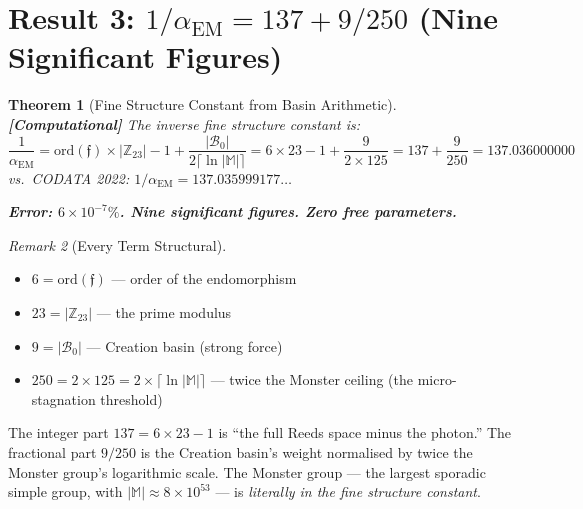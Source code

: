\documentclass[12pt,a4paper]{article}
\newcommand{\computational}[1]{\textcolor{computational}{\textbf{[Computational]}} #1}
\newtheorem{theorem}{Theorem}[section]
\theoremstyle{definition}\newtheorem{definition}[theorem]{Definition}
\theoremstyle{remark}\newtheorem{remark}[theorem]{Remark}
\newcommand{\Reeds}{\mathfrak{f}}
\newcommand{\Zp}{\mathbb{Z}_{23}}
\newcommand{\Basin}{\mathcal{B}}
\begin{document}
\section{Result 3: $1/\alpha_{\mathrm{EM}} = 137 + 9/250$ (Nine Significant Figures)}
\label{sec:alpha}

\begin{theorem}[Fine Structure Constant from Basin Arithmetic]
\label{thm:alpha}
\computational{The inverse fine structure constant is:}
\begin{equation}
  \boxed{\frac{1}{\alpha_{\mathrm{EM}}} = \mathrm{ord}(\Reeds) \times |\Zp| - 1
  + \frac{|\Basin_0|}{2 \lceil \ln|\mathbb{M}| \rceil}
  = 6 \times 23 - 1 + \frac{9}{2 \times 125}
  = 137 + \frac{9}{250}
  = 137.036000000}
\end{equation}
vs.\ CODATA 2022: $1/\alpha_{\mathrm{EM}} = 137.035999177\ldots$

\textbf{Error: $6 \times 10^{-7}\%$. Nine significant figures. Zero free parameters.}
\end{theorem}

\begin{remark}[Every Term Structural]
\begin{itemize}
  \item $6 = \mathrm{ord}(\Reeds)$ --- order of the endomorphism
  \item $23 = |\Zp|$ --- the prime modulus
  \item $9 = |\Basin_0|$ --- Creation basin (strong force)
  \item $250 = 2 \times 125 = 2 \times \lceil \ln|\mathbb{M}| \rceil$
  --- twice the Monster ceiling (the micro-stagnation threshold)
\end{itemize}
The integer part $137 = 6 \times 23 - 1$ is ``the full Reeds space minus the
photon.'' The fractional part $9/250$ is the Creation basin's weight normalised
by twice the Monster group's logarithmic scale. The Monster group --- the
largest sporadic simple group, with $|\mathbb{M}| \approx 8 \times 10^{53}$
--- is \emph{literally in the fine structure constant}.
\end{remark}
\end{document}
